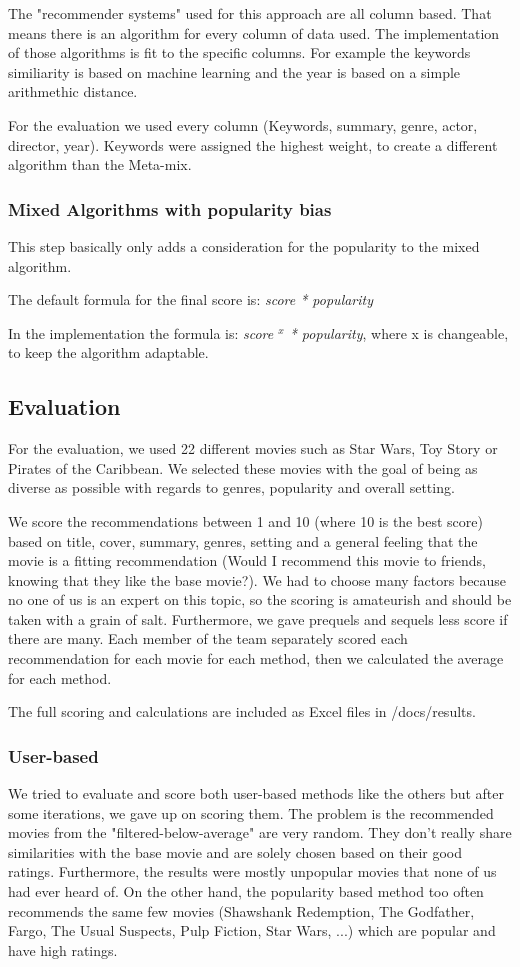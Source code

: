 \documentclass{article}
\begin{document}
The "recommender systems" used for this approach are all column based. That means there is an algorithm for every column of data used. The implementation of those algorithms is fit to the specific columns. For example the keywords similiarity is based on machine learning and the year is based on a simple arithmethic distance.

For the evaluation we used every column (Keywords, summary, genre, actor, director, year). Keywords were assigned the highest weight, to create a different algorithm than the Meta-mix.
\subsubsection{Mixed Algorithms with popularity bias}
This step basically only adds a consideration for the popularity to the mixed algorithm.

The default formula for the final score is: \emph{score * popularity}

In the implementation the formula is: \emph{score $^{x}$ * popularity}, where x is changeable, to keep the algorithm adaptable.
\subsection{Evaluation}
For the evaluation, we used 22 different movies such as Star Wars, Toy Story or Pirates of the Caribbean.
We selected these movies with the goal of being as diverse as possible with regards to genres, popularity and overall setting.

We score the recommendations between 1 and 10 (where 10 is the best score) based on title, cover, summary, genres, setting and a general feeling that the movie is a fitting recommendation (Would I recommend this movie to friends, knowing that they like the base movie?). We had to choose many factors because no one of us is an expert on this topic, so the scoring is amateurish and should be taken with a grain of salt. Furthermore, we gave prequels and sequels less score if there are many.
Each member of the team separately scored each recommendation for each movie for each method, then we calculated the average for each method.

The full scoring and calculations are included as Excel files in /docs/results.
\subsubsection{User-based}
We tried to evaluate and score both user-based methods like the others but after some iterations, we gave up on scoring them. The problem is the recommended movies from the "filtered-below-average" are very random. They don't really share similarities with the base movie and are solely chosen based on their good ratings. Furthermore, the results were mostly unpopular movies that none of us had ever heard of. On the other hand, the popularity based method too often recommends the same few movies (Shawshank Redemption, The Godfather, Fargo, The Usual Suspects, Pulp Fiction, Star Wars, ...) which are popular and have high ratings.
\end{document}
